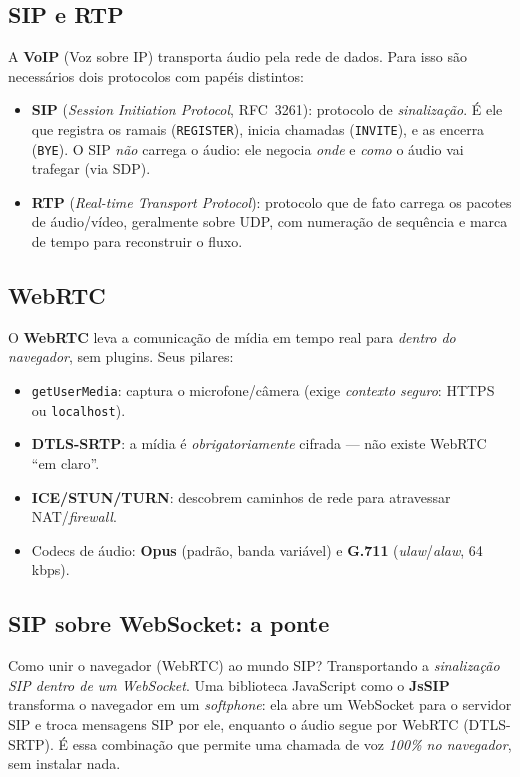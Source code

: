 \documentclass[11pt,a4paper]{article}
\begin{document}
\subsection{SIP e RTP}
A \textbf{VoIP} (Voz sobre IP) transporta áudio pela rede de dados. Para isso são necessários
dois protocolos com papéis distintos:

\begin{itemize}[nosep]
  \item \textbf{SIP} (\emph{Session Initiation Protocol}, RFC~3261): protocolo de
  \emph{sinalização}. É ele que registra os ramais (\verb|REGISTER|), inicia chamadas
  (\verb|INVITE|), e as encerra (\verb|BYE|). O SIP \emph{não} carrega o áudio: ele negocia
  \emph{onde} e \emph{como} o áudio vai trafegar (via SDP).
  \item \textbf{RTP} (\emph{Real-time Transport Protocol}): protocolo que de fato carrega os
  pacotes de áudio/vídeo, geralmente sobre UDP, com numeração de sequência e marca de tempo
  para reconstruir o fluxo.
\end{itemize}

\subsection{WebRTC}
O \textbf{WebRTC} leva a comunicação de mídia em tempo real para \emph{dentro do navegador},
sem plugins. Seus pilares:

\begin{itemize}[nosep]
  \item \verb|getUserMedia|: captura o microfone/câmera (exige \emph{contexto seguro}:
  HTTPS ou \verb|localhost|).
  \item \textbf{DTLS-SRTP}: a mídia é \emph{obrigatoriamente} cifrada --- não existe WebRTC
  ``em claro''.
  \item \textbf{ICE/STUN/TURN}: descobrem caminhos de rede para atravessar NAT/\emph{firewall}.
  \item Codecs de áudio: \textbf{Opus} (padrão, banda variável) e \textbf{G.711}
  (\emph{ulaw}/\emph{alaw}, 64\,kbps).
\end{itemize}

\subsection{SIP sobre WebSocket: a ponte}
Como unir o navegador (WebRTC) ao mundo SIP? Transportando a \emph{sinalização SIP dentro de
um WebSocket}. Uma biblioteca JavaScript como o \textbf{JsSIP} transforma o navegador em um
\emph{softphone}: ela abre um WebSocket para o servidor SIP e troca mensagens SIP por ele,
enquanto o áudio segue por WebRTC (DTLS-SRTP). É essa combinação que permite uma chamada de
voz \emph{100\% no navegador}, sem instalar nada.
\end{document}

